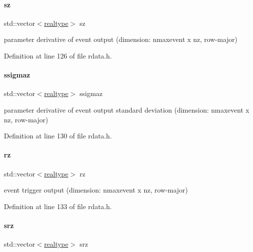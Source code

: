 \paragraph{\texorpdfstring{sz}{sz}}
{\footnotesize\ttfamily std\+::vector$<$\mbox{\hyperlink{namespaceamici_a1bdce28051d6a53868f7ccbf5f2c14a3}{realtype}}$>$ sz}

parameter derivative of event output (dimension\+: nmaxevent x nz, row-\/major) 

Definition at line 126 of file rdata.\+h.

\mbox{\label{classamici_1_1_return_data_a23c0635afe68ab5c73095fa1e4d61055}} 
\paragraph{\texorpdfstring{ssigmaz}{ssigmaz}}
{\footnotesize\ttfamily std\+::vector$<$\mbox{\hyperlink{namespaceamici_a1bdce28051d6a53868f7ccbf5f2c14a3}{realtype}}$>$ ssigmaz}

parameter derivative of event output standard deviation (dimension\+: nmaxevent x nz, row-\/major) 

Definition at line 130 of file rdata.\+h.

\mbox{\label{classamici_1_1_return_data_a1f65c4ec9c07d353d79f54d4c96365ca}} 
\paragraph{\texorpdfstring{rz}{rz}}
{\footnotesize\ttfamily std\+::vector$<$\mbox{\hyperlink{namespaceamici_a1bdce28051d6a53868f7ccbf5f2c14a3}{realtype}}$>$ rz}

event trigger output (dimension\+: nmaxevent x nz, row-\/major) 

Definition at line 133 of file rdata.\+h.

\mbox{\label{classamici_1_1_return_data_ada7991b82464e52bcdc20c69175fe1e9}} 
\paragraph{\texorpdfstring{srz}{srz}}
{\footnotesize\ttfamily std\+::vector$<$\mbox{\hyperlink{namespaceamici_a1bdce28051d6a53868f7ccbf5f2c14a3}{realtype}}$>$ srz}

